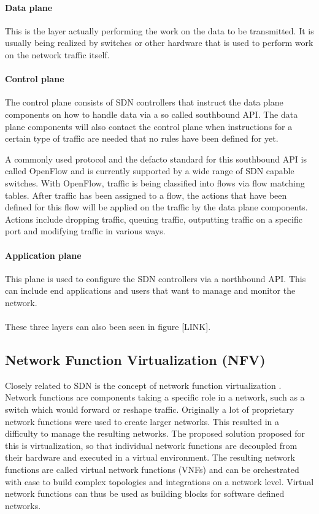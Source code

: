 \paragraph{Data plane} This is the layer actually performing the work on the data to be transmitted. It is usually being realized by switches or other hardware that is used to perform work on the network traffic itself.

\paragraph{Control plane} The control plane consists of SDN controllers that instruct the data plane components on how to handle data via a so called southbound API. The data plane components will also contact the control plane when instructions for a certain type of traffic are needed that no rules have been defined for yet.

A commonly used protocol and the defacto standard for this southbound API is called OpenFlow \cite{openflow} and is currently supported by a wide range of SDN capable switches. With OpenFlow, traffic is being classified into flows via flow matching tables. After traffic has been assigned to a flow, the actions that have been defined for this flow will be applied on the traffic by the data plane components. Actions include dropping traffic, queuing traffic, outputting traffic on a specific port and modifying traffic in various ways.

\paragraph{Application plane} This plane is used to configure the SDN controllers via a northbound API. This can include end applications and users that want to manage and monitor the network.

\paragraph{}These three layers can also been seen in figure [LINK]. %

\subsection{Network Function Virtualization (NFV)}
Closely related to SDN is the concept of network function virtualization \cite{nfv}. Network functions are components taking a specific role in a network, such as a switch which would forward or reshape traffic. Originally a lot of proprietary network functions were used to create larger networks. This resulted in a difficulty to manage the resulting networks. The proposed solution proposed for this is virtualization, so that individual network functions are decoupled from their hardware and executed in a virtual environment. The resulting network functions are called virtual network functions (VNFs) and can be orchestrated with ease to build complex topologies and integrations on a network level. Virtual network functions can thus be used as building blocks for software defined networks.

